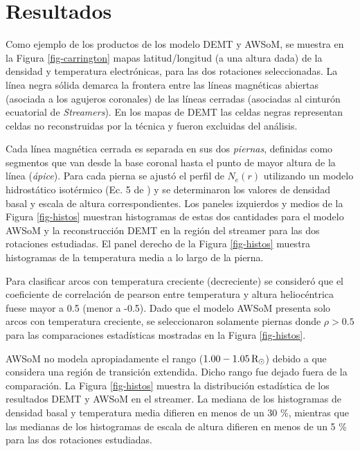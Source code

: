 \documentclass[baaa]{baaa}
\begin{document}


\section{Resultados}
Como ejemplo de los productos de los modelo DEMT y AWSoM, se muestra en la Figura \ref{fig-carrington} mapas latitud/longitud (a una altura dada) de la densidad y temperatura electrónicas, para las dos rotaciones seleccionadas. La línea negra sólida demarca la frontera entre las líneas magnéticas abiertas (asociada a los agujeros coronales) de las líneas cerradas (asociadas al cinturón ecuatorial de \emph{Streamers}). En los mapas de DEMT las celdas negras representan celdas no reconstruidas por la técnica y fueron excluidas del análisis.


Cada línea magnética cerrada es separada en sus dos \emph{piernas}, definidas como segmentos que van desde la base coronal hasta el punto de mayor altura de la línea (\emph{ápice}). Para cada  pierna  se ajustó el perfil de $N_e(r)$ utilizando un modelo hidrostático isotérmico (Ec. 5 de \citet{lloveras_2017}) y se determinaron los valores de densidad basal y escala de altura correspondientes. Los paneles izquierdos y medios de la Figura \ref{fig-histos} muestran histogramas de estas dos cantidades para el modelo AWSoM y la reconstrucción DEMT en la región del streamer para las dos rotaciones estudiadas. El panel derecho de la Figura \ref{fig-histos} muestra histogramas de la temperatura media a lo largo de la pierna.



Para clasificar arcos con temperatura creciente (decreciente) se consideró que el coeficiente de correlación de pearson entre temperatura y altura heliocéntrica fuese mayor a 0.5 (menor a -0.5). Dado que el modelo AWSoM presenta solo arcos con temperatura creciente, se seleccionaron solamente piernas donde $\rho> 0.5$ para las comparaciones estadísticas mostradas en la Figura \ref{fig-histos}.


AWSoM no modela apropiadamente el rango ($1.00 - 1.05\,{\rm R_\odot}$) debido a que considera una región de transición extendida. Dicho rango fue dejado fuera de la comparación. La Figura \ref{fig-histos} muestra la distribución estadística de los resultados DEMT y AWSoM en el streamer. La mediana de los histogramas de densidad basal y temperatura media difieren en menos de un 30 \%, mientras que las medianas de los histogramas de escala de altura difieren en menos de un 5 \% para las dos rotaciones estudiadas.
\end{document}
